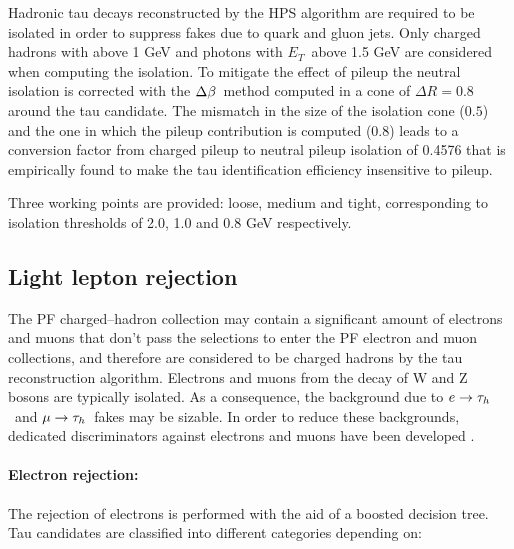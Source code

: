 Hadronic tau decays reconstructed by the HPS algorithm are %
required to be isolated in order to suppress fakes due to quark and gluon jets. Only charged hadrons with \pT above 1 GeV and photons with $E_T$\ above 1.5 GeV are considered when computing the isolation. To mitigate the effect of pileup the neutral isolation is corrected with the $\Delta\beta$\ method computed in a cone of $\Delta R = 0.8$ around the tau candidate. The mismatch in the size of the isolation cone ($0.5$) and the one in which the pileup contribution is computed (0.8) leads to a conversion factor from charged pileup to neutral pileup isolation of 0.4576 that is empirically found to make the tau identification efficiency insensitive to pileup.

Three working points are provided: loose, medium and tight, corresponding to isolation thresholds of 2.0, 1.0 and 0.8 GeV respectively.


\subsection{Light lepton rejection}

The PF charged--hadron collection may contain a significant amount of electrons and muons that don't pass the selections to enter the PF electron and muon collections, and therefore are considered to be charged hadrons by the tau reconstruction algorithm. Electrons and muons from the decay of W and Z bosons are typically isolated. 
As a consequence, the background due to $e\rightarrow\tau_h$\ and $\mu\rightarrow\tau_h$\ fakes may be sizable. %
In order to reduce these backgrounds, dedicated discriminators against electrons and muons have been developed \cite{AN-12-417}.

\paragraph{Electron rejection:} The rejection of electrons is performed with the aid of a boosted decision tree. Tau candidates are classified into different categories depending on:

